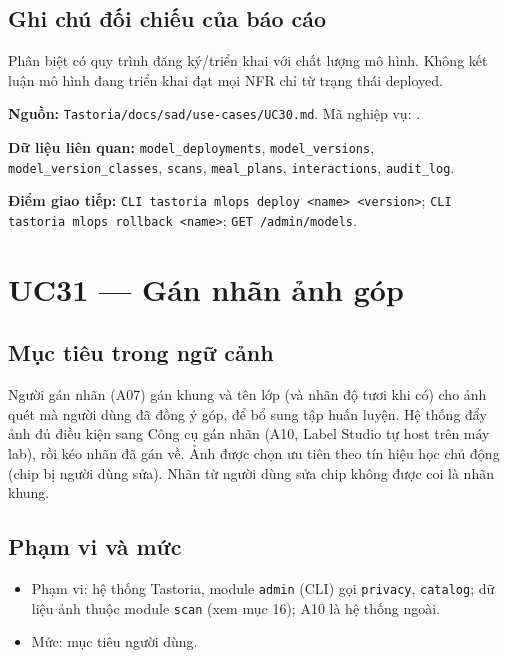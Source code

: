 \subsection{Ghi chú đối chiếu của báo cáo}
Phân biệt có quy trình đăng ký/\allowbreak{}triển khai với chất lượng mô hình. Không kết luận mô hình đang triển khai đạt mọi NFR chỉ từ trạng thái deployed.

\textbf{Nguồn:} {\small\texttt{Tastoria/\allowbreak{}\allowbreak{}docs/\allowbreak{}\allowbreak{}sad/\allowbreak{}\allowbreak{}use-\allowbreak{}cases/\allowbreak{}\allowbreak{}UC30.\allowbreak{}md}}. Mã nghiệp vụ: .

\textbf{Dữ liệu liên quan:} {\small\texttt{model\_\allowbreak{}\allowbreak{}deployments}}, {\small\texttt{model\_\allowbreak{}\allowbreak{}versions}}, {\small\texttt{model\_\allowbreak{}\allowbreak{}version\_\allowbreak{}\allowbreak{}classes}}, {\small\texttt{scans}}, {\small\texttt{meal\_\allowbreak{}\allowbreak{}plans}}, {\small\texttt{interactions}}, {\small\texttt{audit\_\allowbreak{}\allowbreak{}log}}.

\textbf{Điểm giao tiếp:} {\small\texttt{CLI tastoria mlops deploy <name> <version>}}; {\small\texttt{CLI tastoria mlops rollback <name>}}; {\small\texttt{GET /\allowbreak{}\allowbreak{}admin/\allowbreak{}\allowbreak{}models}}.

\section{UC31 --- Gán nhãn ảnh góp}
\subsection{Mục tiêu trong ngữ cảnh}
Người gán nhãn (A07) gán khung và tên lớp (và nhãn độ tươi khi có) cho ảnh quét mà người dùng đã đồng ý góp, để bổ sung tập huấn luyện. Hệ thống đẩy ảnh đủ điều kiện sang Công cụ gán nhãn (A10, Label Studio tự host trên máy lab), rồi kéo nhãn đã gán về. Ảnh được chọn ưu tiên theo tín hiệu học chủ động (chip bị người dùng sửa). Nhãn từ người dùng sửa chip không được coi là nhãn khung.

\subsection{Phạm vi và mức}
\begin{itemize}
\item Phạm vi: hệ thống Tastoria, module {\small\texttt{admin}} (CLI) gọi {\small\texttt{privacy}}, {\small\texttt{catalog}}; dữ liệu ảnh thuộc module {\small\texttt{scan}} (xem mục 16); A10 là hệ thống ngoài.
\item Mức: mục tiêu người dùng.
\end{itemize}
